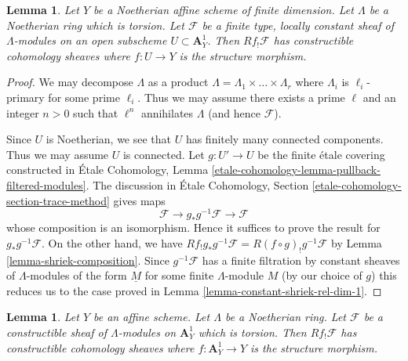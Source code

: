\documentclass{stacks-project}
\theoremstyle{plain}
\newtheorem{lemma}[subsection]{Lemma}
\theoremstyle{definition}
\theoremstyle{remark}
\numberwithin{equation}{subsection}
\begin{document}
\begin{lemma}
\label{lemma-loc-constant-shriek-rel-dim-1}
Let $Y$ be a Noetherian affine scheme of finite dimension.
Let $\Lambda$ be a Noetherian ring which is torsion.
Let $\mathcal{F}$ be a finite type, locally constant sheaf of
$\Lambda$-modules on an open subscheme $U \subset \mathbf{A}^1_Y$.
Then $Rf_!\mathcal{F}$ has constructible cohomology sheaves where
$f : U \to Y$ is the structure morphism.
\end{lemma}

\begin{proof}
We may decompose $\Lambda$ as a product
$\Lambda = \Lambda_1 \times \ldots \times \Lambda_r$
where $\Lambda_i$ is $\ell_i$-primary for some prime $\ell_i$.
Thus we may assume there exists a prime $\ell$ and an integer $n > 0$
such that $\ell^n$ annihilates $\Lambda$ (and hence $\mathcal{F}$).

\medskip\noindent
Since $U$ is Noetherian, we see that $U$ has finitely many connected
components. Thus we may assume $U$ is connected.
Let $g : U' \to U$ be the finite \'etale covering
constructed in \'Etale Cohomology, Lemma
\ref{etale-cohomology-lemma-pullback-filtered-modules}.
The discussion in
\'Etale Cohomology, Section \ref{etale-cohomology-section-trace-method}
gives maps
$$
\mathcal{F} \to g_*g^{-1}\mathcal{F} \to \mathcal{F}
$$
whose composition is an isomorphism. Hence it suffices to
prove the result for $g_*g^{-1}\mathcal{F}$. On the other hand,
we have $Rf_!g_*g^{-1}\mathcal{F} = R(f \circ g)_!g^{-1}\mathcal{F}$
by Lemma \ref{lemma-shriek-composition}.
Since $g^{-1}\mathcal{F}$ has a finite filtration by
constant sheaves of $\Lambda$-modules of the form
$\underline{M}$ for some finite $\Lambda$-module $M$
(by our choice of $g$) this reduces us to the case proved in
Lemma \ref{lemma-constant-shriek-rel-dim-1}.
\end{proof}

\begin{lemma}
\label{lemma-constructible-shriek-rel-dim-1}
Let $Y$ be an affine scheme. Let $\Lambda$ be a Noetherian ring.
Let $\mathcal{F}$ be a constructible sheaf of $\Lambda$-modules on
$\mathbf{A}^1_Y$ which is torsion. Then $Rf_!\mathcal{F}$ has constructible
cohomology sheaves where $f : \mathbf{A}^1_Y \to Y$ is the structure morphism.
\end{lemma}
\end{document}

